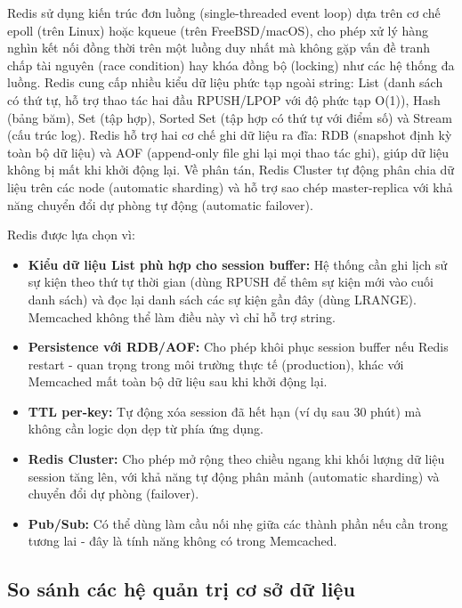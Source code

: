 \documentclass[../BTL.tex]{subfiles}
\begin{document}
Redis sử dụng kiến trúc đơn luồng (single-threaded event loop) dựa trên cơ chế epoll (trên Linux) hoặc kqueue (trên FreeBSD/macOS), cho phép xử lý hàng nghìn kết nối đồng thời trên một luồng duy nhất mà không gặp vấn đề tranh chấp tài nguyên (race condition) hay khóa đồng bộ (locking) như các hệ thống đa luồng. Redis cung cấp nhiều kiểu dữ liệu phức tạp ngoài string: List (danh sách có thứ tự, hỗ trợ thao tác hai đầu RPUSH/LPOP với độ phức tạp O(1)), Hash (bảng băm), Set (tập hợp), Sorted Set (tập hợp có thứ tự với điểm số) và Stream (cấu trúc log). Redis hỗ trợ hai cơ chế ghi dữ liệu ra đĩa: RDB (snapshot định kỳ toàn bộ dữ liệu) và AOF (append-only file ghi lại mọi thao tác ghi), giúp dữ liệu không bị mất khi khởi động lại. Về phân tán, Redis Cluster tự động phân chia dữ liệu trên các node (automatic sharding) và hỗ trợ sao chép master-replica với khả năng chuyển đổi dự phòng tự động (automatic failover).

Redis được lựa chọn vì:
\begin{itemize}
    \item \textbf{Kiểu dữ liệu List phù hợp cho session buffer:} Hệ thống cần ghi lịch sử sự kiện theo thứ tự thời gian (dùng RPUSH để thêm sự kiện mới vào cuối danh sách) và đọc lại danh sách các sự kiện gần đây (dùng LRANGE). Memcached không thể làm điều này vì chỉ hỗ trợ string.
    \item \textbf{Persistence với RDB/AOF:} Cho phép khôi phục session buffer nếu Redis restart - quan trọng trong môi trường thực tế (production), khác với Memcached mất toàn bộ dữ liệu sau khi khởi động lại.
    \item \textbf{TTL per-key:} Tự động xóa session đã hết hạn (ví dụ sau 30 phút) mà không cần logic dọn dẹp từ phía ứng dụng.
    \item \textbf{Redis Cluster:} Cho phép mở rộng theo chiều ngang khi khối lượng dữ liệu session tăng lên, với khả năng tự động phân mảnh (automatic sharding) và chuyển đổi dự phòng (failover).
    \item \textbf{Pub/Sub:} Có thể dùng làm cầu nối nhẹ giữa các thành phần nếu cần trong tương lai - đây là tính năng không có trong Memcached.
\end{itemize}

\subsection{So sánh các hệ quản trị cơ sở dữ liệu}
\end{document}
